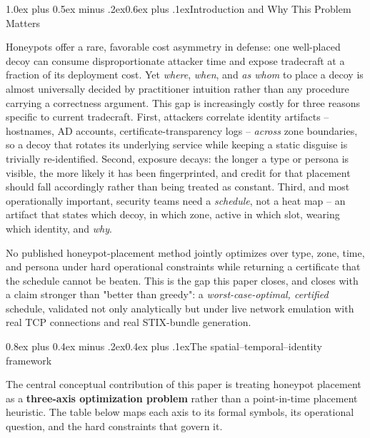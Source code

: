 \documentclass[10pt,twocolumn]{article}
\makeatletter
\renewcommand{\section}{\@startsection{section}{1}{0pt}%
  {1.0ex plus 0.5ex minus .2ex}{0.6ex plus .1ex}{\normalfont\large\bfseries}}
\renewcommand{\subsection}{\@startsection{subsection}{2}{0pt}%
  {0.8ex plus 0.4ex minus .2ex}{0.4ex plus .1ex}{\normalfont\bfseries}}
\makeatother
\begin{document}
\section{Introduction and Why This Problem Matters}

Honeypots offer a rare, favorable cost asymmetry in defense: one well-placed decoy can consume disproportionate attacker time and expose tradecraft at a fraction of its deployment cost. Yet \emph{where}, \emph{when}, and \emph{as whom} to place a decoy is almost universally decided by practitioner intuition rather than any procedure carrying a correctness argument. This gap is increasingly costly for three reasons specific to current tradecraft. First, attackers correlate identity artifacts -- hostnames, AD accounts, certificate-transparency logs -- \emph{across} zone boundaries, so a decoy that rotates its underlying service while keeping a static disguise is trivially re-identified. Second, exposure decays: the longer a type or persona is visible, the more likely it has been fingerprinted, and credit for that placement should fall accordingly rather than being treated as constant. Third, and most operationally important, security teams need a \emph{schedule}, not a heat map -- an artifact that states which decoy, in which zone, active in which slot, wearing which identity, and \emph{why}.

No published honeypot-placement method jointly optimizes over type, zone, time, and persona under hard operational constraints while returning a certificate that the schedule cannot be beaten. This is the gap this paper closes, and closes with a claim stronger than "better than greedy": a \emph{worst-case-optimal, certified} schedule, validated not only analytically but under live network emulation with real TCP connections and real STIX-bundle generation.

\subsection{The spatial--temporal--identity framework}\label{sec:sti}

The central conceptual contribution of this paper is treating honeypot placement as a \textbf{three-axis optimization problem} rather than a point-in-time placement heuristic. The table below maps each axis to its formal symbols, its operational question, and the hard constraints that govern it.
\end{document}
